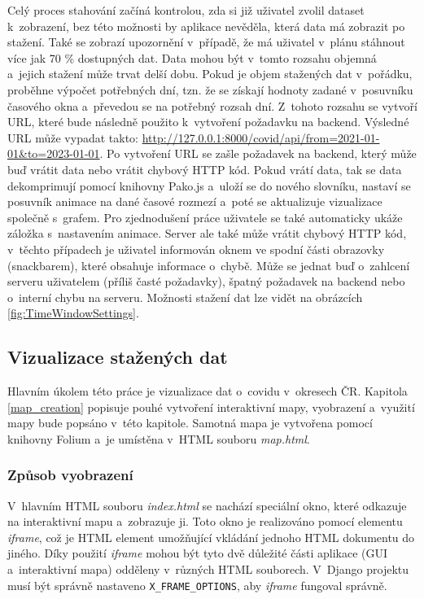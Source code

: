 Celý proces stahování začíná kontrolou, zda si již uživatel zvolil dataset k~zobrazení, bez této možnosti by aplikace nevěděla, která data má zobrazit po stažení. Také se zobrazí upozornění v~případě, že má uživatel v~plánu stáhnout více jak 70 \% dostupných dat. Data mohou být v~tomto rozsahu objemná a~jejich stažení může trvat delší dobu. Pokud je objem stažených dat v~pořádku, proběhne výpočet potřebných dní, tzn. že se získají hodnoty zadané v~posuvníku časového okna a~převedou se na potřebný rozsah dní. Z~tohoto rozsahu se vytvoří URL, které bude následně použito k~vytvoření požadavku na backend. Výsledné URL může vypadat takto: \url{http://127.0.0.1:8000/covid/api/from=2021-01-01&to=2023-01-01}. Po vytvoření URL se zašle požadavek na backend, který může buď vrátit data nebo vrátit chybový HTTP kód. Pokud vrátí data, tak se data dekomprimují pomocí knihovny Pako.js a~uloží se do nového slovníku, nastaví se posuvník animace na dané časové rozmezí a~poté se aktualizuje vizualizace společně s~grafem. Pro zjednodušení práce uživatele se také automaticky ukáže záložka s~nastavením animace. Server ale také může vrátit chybový HTTP kód, v~těchto případech je uživatel informován oknem ve spodní části obrazovky (snackbarem), které obsahuje informace o~chybě. Může se jednat buď o~zahlcení serveru uživatelem (příliš časté požadavky), špatný požadavek na backend nebo o~interní chybu na serveru. Možnosti stažení dat lze vidět na obrázcích \ref{fig:TimeWindowSettings}.

\subsection{Vizualizace stažených dat}

Hlavním úkolem této práce je vizualizace dat o~covidu v~okresech ČR. Kapitola \ref{map_creation} popisuje pouhé vytvoření interaktivní mapy, vyobrazení a~využití mapy bude popsáno v~této kapitole. Samotná mapa je vytvořena pomocí knihovny Folium a~je umístěna v~HTML souboru \emph{map.html}.

\subsubsection*{Způsob vyobrazení}

V~hlavním HTML souboru \emph{index.html} se nachází speciální okno, které odkazuje na interaktivní mapu a~zobrazuje ji. Toto okno je realizováno pomocí elementu \emph{iframe}, což je HTML element umožňující vkládání jednoho HTML dokumentu do jiného. Díky použití \emph{iframe} mohou být tyto dvě důležité části aplikace (GUI a~interaktivní mapa) odděleny v~různých HTML souborech. V~Django projektu musí být správně nastaveno \texttt{X\_FRAME\_OPTIONS}, aby \emph{iframe} fungoval správně.

